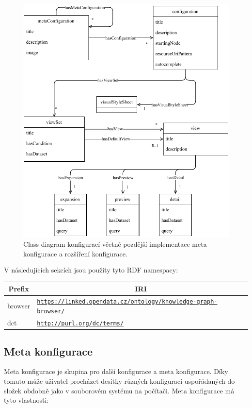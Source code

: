 \begin{figure}
    \centering
    \includegraphics{media/configuration-class-diagram.pdf}
    \caption{Class diagram konfigurací včetně pozdější implementace meta konfigurace a rozšíření konfigurace.}
    \label{fig:configuration-class-diagram}
\end{figure}

\bigskip

V následujících sekcích jsou použity tyto RDF namespacy:
\begin{table}[h] \centering
\begin{tabular}{lp{10cm}}
\toprule
\multicolumn{1}{c}{Prefix} & \multicolumn{1}{c}{IRI}                                      \\
\midrule
browser                    & \texttt{\url{https://linked.opendata.cz/ontology/knowledge-graph-browser/}} \\
dct                        & \texttt{\url{http://purl.org/dc/terms/}}
\end{tabular}
\end{table}

\newpage

\subsection{Meta konfigurace} \label{pozadavky-metakonfigurace}
Meta konfigurace je skupina pro další konfigurace a meta konfigurace. Díky tomuto může uživatel procházet desítky různých konfigurací uspořádaných do složek obdobně jako v souborovém systému na počítači. Meta konfigurace má tyto vlastnosti:

